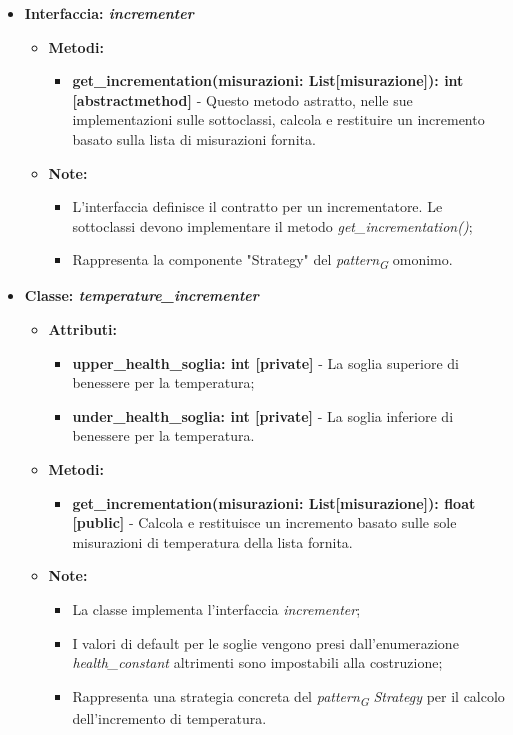 \begin{itemize}
    \item \textbf{Interfaccia: \textit{incrementer}}
    \begin{itemize}
        \item \textbf{Metodi:}
        \begin{itemize}
            \item \textbf{get\_incrementation(misurazioni: List[misurazione]): int [abstractmethod]} - Questo metodo astratto, nelle sue implementazioni sulle sottoclassi, calcola e restituire un incremento basato sulla lista di misurazioni fornita.
        \end{itemize}
        \item\textbf{Note:}
        \begin{itemize}
            \item L'interfaccia definisce il contratto per un incrementatore. Le sottoclassi devono implementare il metodo \textit{get\_incrementation()};
            \item Rappresenta la componente "Strategy" del \textit{pattern}\textsubscript{\textit{G}} omonimo.
        \end{itemize}
    \end{itemize}

    \item \textbf{Classe: \textit{temperature\_incrementer}}
    \begin{itemize}
        \item \textbf{Attributi:}
        \begin{itemize}
            \item \textbf{upper\_health\_soglia: int [private]} - La soglia superiore di benessere per la temperatura;
            \item \textbf{under\_health\_soglia: int [private]} - La soglia inferiore di benessere per la temperatura.
        \end{itemize}
        \item \textbf{Metodi:}
        \begin{itemize}
            \item \textbf{get\_incrementation(misurazioni: List[misurazione]): float [public]} - Calcola e restituisce un incremento basato sulle sole misurazioni di temperatura della lista fornita.
        \end{itemize}
        \item\textbf{Note:}
            \begin{itemize}
                \item La classe implementa l'interfaccia \textit{incrementer};
                \item I valori di default per le soglie vengono presi dall'enumerazione \textit{health\_constant} altrimenti sono impostabili alla costruzione;
                \item Rappresenta una strategia concreta del \textit{pattern}\textsubscript{\textit{G}} \textit{Strategy} per il calcolo dell'incremento di temperatura.
            \end{itemize}
        \end{itemize}


\end{itemize}
